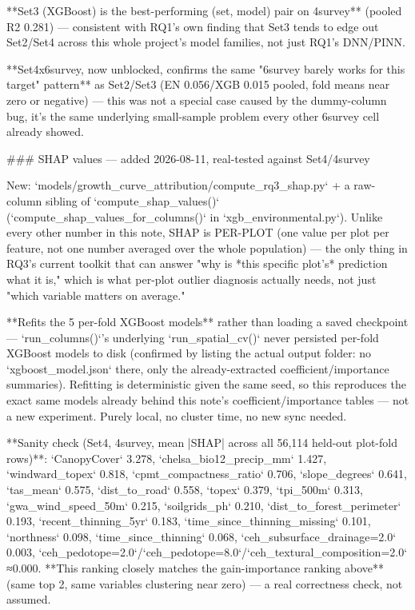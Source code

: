 **Set3 (XGBoost) is the best-performing (set, model) pair on 4survey** (pooled R2 0.281) —
consistent with RQ1's own finding that Set3 tends to edge out Set2/Set4 across this whole
project's model families, not just RQ1's DNN/PINN.

**Set4x6survey, now unblocked, confirms the same "6survey barely works for this target" pattern**
as Set2/Set3 (EN 0.056/XGB 0.015 pooled, fold means near zero or negative) — this was not a
special case caused by the dummy-column bug, it's the same underlying small-sample problem every
other 6survey cell already showed.

### SHAP values — added 2026-08-11, real-tested against Set4/4survey

New: `models/growth_curve_attribution/compute_rq3_shap.py` + a raw-column sibling of
`compute_shap_values()` (`compute_shap_values_for_columns()` in `xgb_environmental.py`). Unlike
every other number in this note, SHAP is PER-PLOT (one value per plot per feature, not one
number averaged over the whole population) — the only thing in RQ3's current toolkit that can
answer "why is *this specific plot's* prediction what it is," which is what per-plot outlier
diagnosis actually needs, not just "which variable matters on average."

**Refits the 5 per-fold XGBoost models** rather than loading a saved checkpoint —
`run_columns()`'s underlying `run_spatial_cv()` never persisted per-fold XGBoost models to disk
(confirmed by listing the actual output folder: no `xgboost_model.json` there, only the
already-extracted coefficient/importance summaries). Refitting is deterministic given the same
seed, so this reproduces the exact same models already behind this note's coefficient/importance
tables — not a new experiment. Purely local, no cluster time, no new sync needed.

**Sanity check (Set4, 4survey, mean |SHAP| across all 56,114 held-out plot-fold rows)**:
`CanopyCover` 3.278, `chelsa_bio12_precip_mm` 1.427, `windward_topex` 0.818,
`cpmt_compactness_ratio` 0.706, `slope_degrees` 0.641, `tas_mean` 0.575, `dist_to_road` 0.558,
`topex` 0.379, `tpi_500m` 0.313, `gwa_wind_speed_50m` 0.215, `soilgrids_ph` 0.210,
`dist_to_forest_perimeter` 0.193, `recent_thinning_5yr` 0.183, `time_since_thinning_missing`
0.101, `northness` 0.098, `time_since_thinning` 0.068, `ceh_subsurface_drainage=2.0` 0.003,
`ceh_pedotope=2.0`/`ceh_pedotope=8.0`/`ceh_textural_composition=2.0` ≈0.000. **This ranking
closely matches the gain-importance ranking above** (same top 2, same variables clustering near
zero) — a real correctness check, not assumed.


